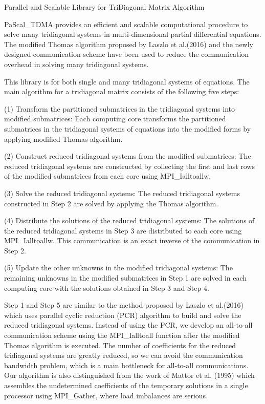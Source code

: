 Parallel and Scalable Library for Tri\+Diagonal Matrix Algorithm

Pa\+Scal\+\_\+\+T\+D\+MA provides an efficient and scalable computational procedure to solve many tridiagonal systems in multi-\/dimensional partial differential equations. The modified Thomas algorithm proposed by Laszlo et al.(2016) and the newly designed communication scheme have been used to reduce the communication overhead in solving many tridiagonal systems.

This library is for both single and many tridiagonal systems of equations. The main algorithm for a tridiagonal matrix consists of the following five steps\+:


\begin{DoxyItemize}
\item (1) Transform the partitioned submatrices in the tridiagonal systems into modified submatrices\+: Each computing core transforms the partitioned submatrices in the tridiagonal systems of equations into the modified forms by applying modified Thomas algorithm.
\item (2) Construct reduced tridiagonal systems from the modified submatrices\+: The reduced tridiagonal systems are constructed by collecting the first and last rows of the modified submatrices from each core using M\+P\+I\+\_\+\+Ialltoallw.
\item (3) Solve the reduced tridiagonal systems\+: The reduced tridiagonal systems constructed in Step 2 are solved by applying the Thomas algorithm.
\item (4) Distribute the solutions of the reduced tridiagonal systems\+: The solutions of the reduced tridiagonal systems in Step 3 are distributed to each core using M\+P\+I\+\_\+\+Ialltoallw. This communication is an exact inverse of the communication in Step 2.
\item (5) Update the other unknowns in the modified tridiagonal systems\+: The remaining unknowns in the modified submatrices in Step 1 are solved in each computing core with the solutions obtained in Step 3 and Step 4.
\end{DoxyItemize}

Step 1 and Step 5 are similar to the method proposed by Laszlo et al.(2016) which uses parallel cyclic reduction (P\+CR) algorithm to build and solve the reduced tridiagonal systems. Instead of using the P\+CR, we develop an all-\/to-\/all communication scheme using the M\+P\+I\+\_\+\+Ialltoall function after the modified Thomas algorithm is executed. The number of coefficients for the reduced tridiagonal systems are greatly reduced, so we can avoid the communication bandwidth problem, which is a main bottleneck for all-\/to-\/all communications. Our algorithm is also distinguished from the work of Mattor et al. (1995) which assembles the undetermined coefficients of the temporary solutions in a single processor using M\+P\+I\+\_\+\+Gather, where load imbalances are serious.

